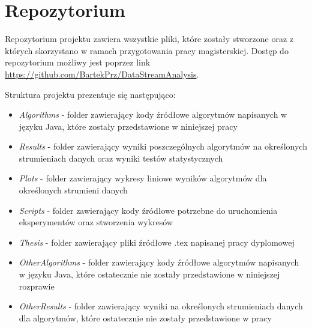 \chapter{Repozytorium}
\label{Chapter:Repository}

\noindent Repozytorium projektu zawiera wszystkie pliki, które zostały stworzone oraz z których skorzystano w ramach przygotowania pracy magisterskiej. Dostęp do repozytorium możliwy jest poprzez link \url{https://github.com/BartekPrz/DataStreamAnalysis}.

\noindent Struktura projektu prezentuje się następująco:

\begin{itemize}
    \item \textit{Algorithms} - folder zawierający kody źródłowe algorytmów napisanych w języku Java, które zostały przedstawione w niniejszej pracy
    \item \textit{Results} - folder zawierający wyniki poszczególnych algorytmów na określonych strumieniach danych oraz wyniki testów statystycznych
    \item \textit{Plots} - folder zawierający wykresy liniowe wyników algorytmów dla określonych strumieni danych
    \item \textit{Scripts} - folder zawierający kody źródłowe potrzebne do uruchomienia eksperymentów oraz stworzenia wykresów
    \item \textit{Thesis} - folder zawierający pliki źródłowe .tex napisanej pracy dyplomowej
    \item \textit{OtherAlgorithms} - folder zawierający kody źródłowe algorytmów napisanych w języku Java, które ostatecznie nie zostały przedstawione w niniejszej rozprawie
    \item \textit{OtherResults} - folder zawierający wyniki na określonych strumieniach danych dla algorytmów, które ostatecznie nie zostały przedstawione w pracy
\end{itemize}